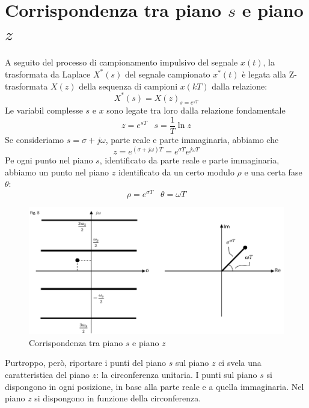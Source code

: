 \documentclass[a4paper]{report}
\begin{document}
\chapter{Corrispondenza tra piano $s$ e piano $z$}
A seguito del processo di campionamento impulsivo del segnale $x(t)$,
la trasformata da Laplace $X^{*}(s)$ del segnale campionato $x^{*}(t)$
\`e legata alla Z-trasformata $X(z)$ della sequenza di campioni
$x(kT)$ dalla relazione:
\[
X^{*}(s) = X(z)_{s = e^{sT}}
\]
Le variabil complesse $s$ e $x$ sono legate tra loro dalla relazione
fondamentale
\begin{equation}
  z = e^{sT} \;\;\; s = \dfrac{1}{T} \ln z
\end{equation}
Se consideriamo $s = \sigma + j \omega$, parte reale e parte
immaginaria, abbiamo che
\[
z = e^{(\sigma + j \omega)T} = e^{\sigma T} e^{j \omega T}
\]
Pe ogni punto nel piano $s$, identificato da parte reale e parte
immaginaria, abbiamo un punto nel piano $z$ identificato da un certo
modulo $\rho$ e una certa fase $\theta$:
\[
\rho = e^{\sigma T} \;\;\; \theta = \omega T
\]
\begin{figure}[!h]
  \begin{center}
    \includegraphics[scale=0.3]{./figures/pianoSpianoZ.png}
    \caption{Corrispondenza tra piano $s$ e piano
      $z$}\label{fig:pianoSpianoZ} 
  \end{center}
\end{figure}
Purtroppo, per\`o, riportare i punti del piano $s$ sul piano $z$ ci
svela una caratteristica del piano $z$: la circonferenza unitaria. I
punti sul piano $s$ si dispongono in ogni posizione, in base alla
parte reale e a quella immaginaria. Nel piano $z$ si dispongono in
funzione della circonferenza.
\end{document}
